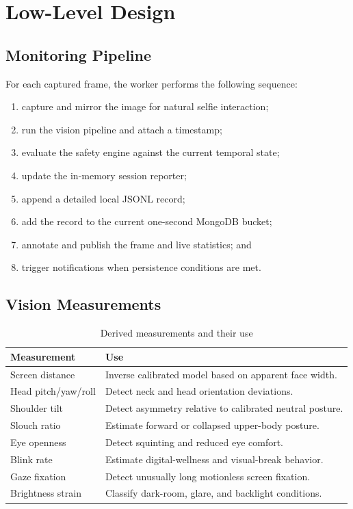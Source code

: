 \documentclass[12pt,a4paper]{report}
\begin{document}
\chapter{Low-Level Design}
\section{Monitoring Pipeline}
For each captured frame, the worker performs the following sequence:
\begin{enumerate}
    \item capture and mirror the image for natural selfie interaction;
    \item run the vision pipeline and attach a timestamp;
    \item evaluate the safety engine against the current temporal state;
    \item update the in-memory session reporter;
    \item append a detailed local JSONL record;
    \item add the record to the current one-second MongoDB bucket;
    \item annotate and publish the frame and live statistics; and
    \item trigger notifications when persistence conditions are met.
\end{enumerate}

\section{Vision Measurements}
\begin{table}[H]
\centering
\caption{Derived measurements and their use}
\begin{tabular}{p{}p{}}
\toprule
\textbf{Measurement} & \textbf{Use}\\
\midrule
Screen distance & Inverse calibrated model based on apparent face width.\\
Head pitch/yaw/roll & Detect neck and head orientation deviations.\\
Shoulder tilt & Detect asymmetry relative to calibrated neutral posture.\\
Slouch ratio & Estimate forward or collapsed upper-body posture.\\
Eye openness & Detect squinting and reduced eye comfort.\\
Blink rate & Estimate digital-wellness and visual-break behavior.\\
Gaze fixation & Detect unusually long motionless screen fixation.\\
Brightness strain & Classify dark-room, glare, and backlight conditions.\\
\bottomrule
\end{tabular}
\end{table}
\end{document}
